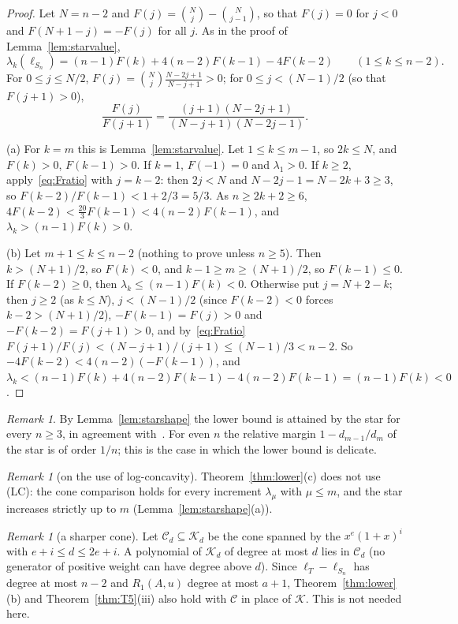 \documentclass[11pt]{amsart}
\theoremstyle{definition}
\theoremstyle{remark}
\newtheorem{remark}[theorem]{Remark}
\newcommand{\K}{\mathcal K}
\begin{document}
\begin{proof}
Let $N=n-2$ and $F(j)=\binom Nj-\binom N{j-1}$, so that $F(j)=0$ for $j<0$
and $F(N+1-j)=-F(j)$ for all $j$. As in the proof of
Lemma~\ref{lem:starvalue},
\[
\lambda_k(\ell_{S_n})=(n-1)F(k)+4(n-2)F(k-1)-4F(k-2)\qquad(1\le k\le n-2).
\]
For $0\le j\le N/2$, $F(j)=\binom Nj\frac{N-2j+1}{N-j+1}>0$; for $0\le j<(N-1)/2$
(so that $F(j+1)>0$),
\begin{equation}\label{eq:Fratio}
\frac{F(j)}{F(j+1)}=\frac{(j+1)(N-2j+1)}{(N-j+1)(N-2j-1)} .
\end{equation}

(a) For $k=m$ this is Lemma~\ref{lem:starvalue}. Let $1\le k\le m-1$, so
$2k\le N$, and $F(k)>0$, $F(k-1)>0$. If $k=1$, $F(-1)=0$ and $\lambda_1>0$. If
$k\ge2$, apply~\eqref{eq:Fratio} with $j=k-2$: then $2j<N$ and
$N-2j-1=N-2k+3\ge3$, so $F(k-2)/F(k-1)<1+2/3=5/3$. As $n\ge2k+2\ge6$,
$4F(k-2)<\frac{20}3F(k-1)<4(n-2)F(k-1)$, and $\lambda_k>(n-1)F(k)>0$.

(b) Let $m+1\le k\le n-2$ (nothing to prove unless $n\ge5$). Then
$k>(N+1)/2$, so $F(k)<0$, and $k-1\ge m\ge(N+1)/2$, so $F(k-1)\le0$. If
$F(k-2)\ge0$, then $\lambda_k\le(n-1)F(k)<0$. Otherwise put $j=N+2-k$; then
$j\ge2$ (as $k\le N$), $j<(N-1)/2$ (since $F(k-2)<0$ forces $k-2>(N+1)/2$),
$-F(k-1)=F(j)>0$
and $-F(k-2)=F(j+1)>0$, and by~\eqref{eq:Fratio}
$F(j+1)/F(j)<(N-j+1)/(j+1)\le(N-1)/3<n-2$. So
$-4F(k-2)<4(n-2)(-F(k-1))$, and
$\lambda_k<(n-1)F(k)+4(n-2)F(k-1)-4(n-2)F(k-1)=(n-1)F(k)<0$.
\end{proof}

\begin{remark}\label{rem:star-peak}
By Lemma~\ref{lem:starshape} the lower bound is attained by the star for every
$n\ge3$, in agreement with~\cite[Theorem~1]{Col89}. For even $n$ the relative
margin $1-d_{m-1}/d_m$ of the star is of order $1/n$; this is the case in
which the lower bound is delicate.
\end{remark}

\begin{remark}[on the use of log-concavity]\label{rem:noLC}
Theorem~\ref{thm:lower}(c) does not use (LC): the cone comparison holds for
every increment $\lambda_\mu$ with $\mu\le m$, and the star increases strictly
up to $m$ (Lemma~\ref{lem:starshape}(a)).
\end{remark}

\begin{remark}[a sharper cone]\label{rem:Ccone}
Let $\mathcal C_d\subseteq\K_d$ be the cone spanned by the $x^e(1+x)^i$ with
$e+i\le d\le2e+i$. A polynomial of $\K_d$ of degree at most $d$ lies in
$\mathcal C_d$ (no generator of positive weight can have degree above $d$).
Since $\ell_T-\ell_{S_n}$ has degree at most $n-2$ and $R_1(A,u)$ degree at
most $a+1$, Theorem~\ref{thm:lower}(b) and Theorem~\ref{thm:T5}(iii) also hold
with $\mathcal C$ in place of $\K$. This is not needed here.
\end{remark}
\end{document}
